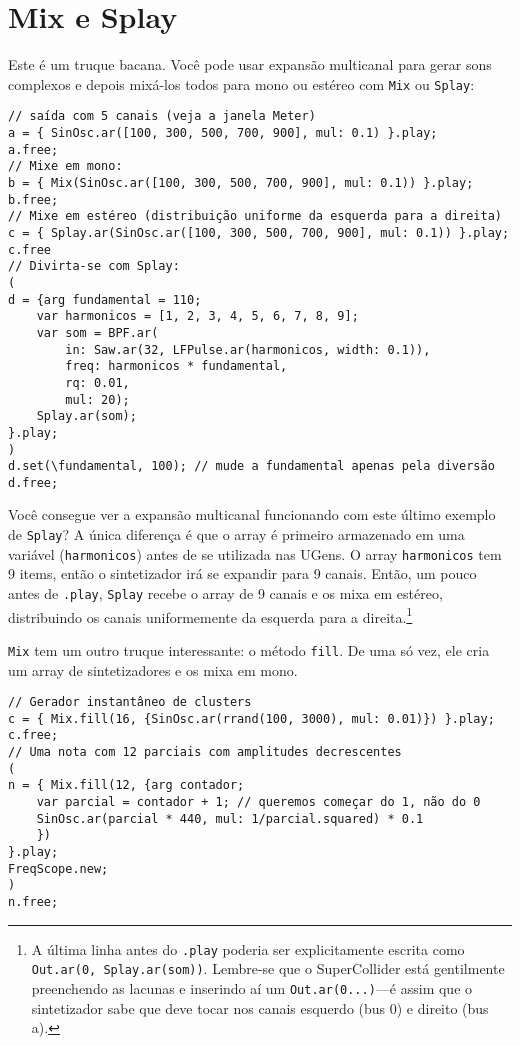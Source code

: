 \section{Mix e Splay}

Este é um truque bacana. Você pode usar expansão multicanal para gerar sons complexos e depois mixá-los todos para mono ou estéreo com \texttt{Mix} ou \texttt{Splay}:
 
\begin{lstlisting}[style=SuperCollider-IDE, basicstyle=\scttfamily\footnotesize]
// saída com 5 canais (veja a janela Meter)
a = { SinOsc.ar([100, 300, 500, 700, 900], mul: 0.1) }.play;
a.free;
// Mixe em mono:
b = { Mix(SinOsc.ar([100, 300, 500, 700, 900], mul: 0.1)) }.play;
b.free;
// Mixe em estéreo (distribuição uniforme da esquerda para a direita)
c = { Splay.ar(SinOsc.ar([100, 300, 500, 700, 900], mul: 0.1)) }.play;
c.free
// Divirta-se com Splay:
(
d = {arg fundamental = 110;
	var harmonicos = [1, 2, 3, 4, 5, 6, 7, 8, 9];
	var som = BPF.ar(
		in: Saw.ar(32, LFPulse.ar(harmonicos, width: 0.1)),
		freq: harmonicos * fundamental,
		rq: 0.01,
		mul: 20);
	Splay.ar(som);	
}.play;
)
d.set(\fundamental, 100); // mude a fundamental apenas pela diversão
d.free;
\end{lstlisting}
 
Você consegue ver a expansão multicanal funcionando com este último exemplo de \texttt{Splay}? A única diferença é que o array é primeiro armazenado em uma variável (\texttt{harmonicos}) antes de se utilizada nas UGens. O array \texttt{harmonicos} tem 9 items, então o sintetizador irá se expandir para 9 canais. Então, um pouco antes de \texttt{.play}, \texttt{Splay} recebe o array de 9 canais e os mixa em estéreo, distribuindo os canais uniformemente da esquerda para a direita.\footnote{A última linha antes do \texttt{.play} poderia ser explicitamente escrita como \texttt{Out.ar(0, Splay.ar(som))}. Lembre-se que o SuperCollider está gentilmente preenchendo as lacunas e inserindo aí um
\texttt{Out.ar(0...)}---é assim que o sintetizador sabe que deve tocar nos canais esquerdo (bus 0) e direito (bus a).}

\texttt{Mix} tem um outro truque interessante: o método \texttt{fill}. De uma só vez, ele cria um array de sintetizadores e os mixa em mono.

\begin{lstlisting}[style=SuperCollider-IDE, basicstyle=\scttfamily\footnotesize]
// Gerador instantâneo de clusters
c = { Mix.fill(16, {SinOsc.ar(rrand(100, 3000), mul: 0.01)}) }.play;
c.free;
// Uma nota com 12 parciais com amplitudes decrescentes
(
n = { Mix.fill(12, {arg contador;
	var parcial = contador + 1; // queremos começar do 1, não do 0
	SinOsc.ar(parcial * 440, mul: 1/parcial.squared) * 0.1
	})
}.play;
FreqScope.new;
)
n.free;
\end{lstlisting}

